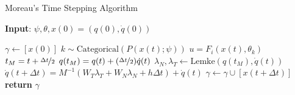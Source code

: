 \begin{algorithm}
    \caption{Moreau's Time Stepping Algorithm}
    \label{algo:moreau}
    \small
    \hspace*{\algorithmicindent} \textbf{Input}: $\psi, \theta, x(0) = (q(0), \dot{q}(0))$
    \begin{algorithmic}[1]
      \State $\gamma \leftarrow  [x(0)]$ 
            \State $k \sim \text{Categorical}(P(x(t); \psi))$ 
            \State $u = F_i(x(t), \theta_k)$      
            \State $t_M = t + \nicefrac{\Delta t}{2}$
            \State $q(t_M) = q(t) +  (\nicefrac{\Delta t}{2}) \dot{q}(t) $
            \State $\lambda_N, \lambda_T \leftarrow \text{Lemke}(q(t_M), \dot{q}(t))$ 
            \State $\dot{q}(t+\Delta t) = M^{-1}(W_T \lambda_T + W_N \lambda_N + h\Delta t) + \dot{q}(t)$
            \State $\gamma \leftarrow \gamma \cup [x(t+\Delta t)]$
          \EndFor
        \State \textbf{return} $\gamma$
    \end{algorithmic}
\end{algorithm}


